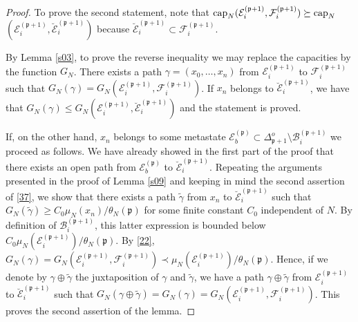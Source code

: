 \documentclass[reqno]{amsart}
\begin{document}
\begin{proof}
To prove the second statement, note that ${{\rm cap}}_N ({{\mathcal E}}^{({{\mathfrak p}}
  +1)}_i, {{\mathcal F}}^{({{\mathfrak p}} +1)}_i) \succeq {{\rm cap}}_N$ $({{\mathcal E}}^{({{\mathfrak p}} +1)}_i
, \breve{{{\mathcal E}}}^{({{\mathfrak p}} +1)}_i)$ because $\breve{{{\mathcal E}}}^{({{\mathfrak p}} +1)}_i
\subset {{\mathcal F}}^{({{\mathfrak p}} +1)}_i$.

By Lemma \ref{s03}, to prove the reverse inequality we may replace the
capacities by the function $G_N$. There exists a path $\gamma = (x_0,
\dots, x_n)$ from ${{\mathcal E}}^{({{\mathfrak p}} +1)}_i$ to ${{\mathcal F}}^{({{\mathfrak p}} +1)}_i$
such that $G_N(\gamma) = G_N({{\mathcal E}}^{({{\mathfrak p}} +1)}_i, {{\mathcal F}}^{({{\mathfrak p}}
  +1)}_i)$. If $x_n$ belongs to $\breve{{{\mathcal E}}}^{({{\mathfrak p}} +1)}_i$, we
have that $G_N(\gamma) \le G_N({{\mathcal E}}^{({{\mathfrak p}} +1)}_i , \breve{{{\mathcal E}}}^{({{\mathfrak p}} +1)}_i)$ and the statement is proved.

If, on the other hand, $x_n$ belongs to some metastate ${{\mathcal E}}^{({{\mathfrak p}})}_b \subset \Delta^o_{{{\mathfrak p}}+1} \setminus {{\mathcal B}}^{({{\mathfrak p}} +1)}_i$ we
proceed as follows. We have already showed in the first part of the
proof that there exists an open path from ${{\mathcal E}}^{({{\mathfrak p}})}_b$ to
$\breve{{{\mathcal E}}}^{({{\mathfrak p}} +1)}_i$. Repeating the arguments presented in
the proof of Lemma \ref{s09} and keeping in mind the second assertion
of \eqref{37}, we show that there exists a path $\tilde \gamma$ from
$x_n$ to $\breve{{{\mathcal E}}}^{({{\mathfrak p}} +1)}_i$ such that $G_N(\tilde \gamma)
\ge C_0 \mu_N(x_n)/\theta_N({{\mathfrak p}})$ for some finite constant $C_0$
independent of $N$. By definition of ${{\mathcal B}}^{({{\mathfrak p}} +1)}_i$, this
latter expression is bounded below $C_0 \mu_N({{\mathcal E}}^{({{\mathfrak p}}
  +1)}_i)/\theta_N({{\mathfrak p}})$. By \eqref{22}, $G_N(\gamma) = G_N({{\mathcal E}}^{({{\mathfrak p}} +1)}_i, {{\mathcal F}}^{({{\mathfrak p}} +1)}_i) \prec \mu_N({{\mathcal E}}^{({{\mathfrak p}}
  +1)}_i)/\theta_N({{\mathfrak p}})$.  Hence, if we denote by $\gamma \oplus
\tilde \gamma$ the juxtaposition of $\gamma$ and $\tilde \gamma$, we
have a path $\gamma \oplus \tilde \gamma$ from ${{\mathcal E}}^{({{\mathfrak p}} +1)}_i$
to $\breve{{{\mathcal E}}}^{({{\mathfrak p}} +1)}_i$ such that $G_N(\gamma \oplus \tilde
\gamma) = G_N(\gamma) = G_N({{\mathcal E}}^{({{\mathfrak p}} +1)}_i, {{\mathcal F}}^{({{\mathfrak p}}
  +1)}_i)$.  This proves the second assertion of the lemma.
\end{proof}
\end{document}
